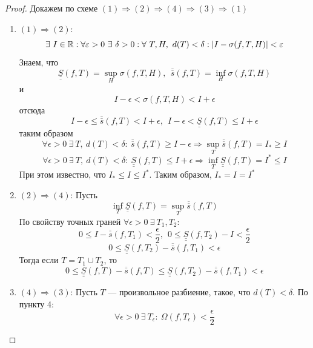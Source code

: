 \begin{proof} Докажем по схеме $(1)\Rightarrow(2) \Rightarrow(4) \Rightarrow (3) \Rightarrow (1)$
    \begin{enumerate}
        \item $(1) \Rightarrow (2)$:
            \[\exists\ I\in \R: \forall \epsilon > 0\ \exists\ \delta > 0: \forall\ T, H,\ d(T) < \delta:|I - \sigma(f, T, H)| < \epsilon\]
            Знаем, что 
            \[\underline{\underline{S}}(f, T) = \sup\limits_H \sigma(f, T, H),\ \ \overline{\overline{s}}(f, T) = \inf\limits_H \sigma(f, T, H)\]
            и
            \[I - \epsilon < \sigma(f, T, H) < I + \epsilon\]
            отсюда
            \[I - \epsilon \leq \overline{\overline{s}}(f, T) < I + \epsilon, \ \ I - \epsilon < \underline{\underline{S}}(f, T) \leq I + \epsilon\]
            таким образом %
            \[\forall \epsilon>0\ \exists\ T,\ d(T)<\delta:\ \overline{\overline{s}}(f,T)\geq I-\epsilon \Rightarrow \sup\limits_{T}\overline{\overline{s}}(f,T) = I_*\geq I\]
            \[\forall \epsilon>0\ \exists\ T,\ d(T)<\delta:\ \underline{\underline{S}}(f,T)\leq I+\epsilon \Rightarrow \inf\limits_{T}\underline{\underline{S}}(f,T)=I^*\leq I\]
            При этом известно, что $I_*\leq I\leq I^*$. Таким образом, $I_*=I=I^*$
        \item $(2)\Rightarrow(4)$: Пусть
            \[\inf \limits_{T} \underline{\underline{S}}(f, T) = \sup \limits_{T} \overline{\overline{s}}(f, T)\]
            По свойству точных граней $\forall \epsilon > 0 \ \exists\ T_1, T_2$:
            \[0 \leq I - \overline{\overline{s}}(f, T_1) < \frac{\epsilon}{2},\ \  0 \leq \underline{\underline{S}}(f, T_2)-I < \frac{\epsilon}{2}\]
            \[0 \leq \underline{\underline{S}}(f, T_2) - \overline{\overline{s}}(f, T_1) < \epsilon\]
            Тогда если $T=T_1\cup T_2$, то 
            \[0\leq \underline{\underline{S}}(f,T)-\overline{\overline{s}}(f,T)\leq \underline{\underline{S}}(f,T_2)-\overline{\overline{s}}(f,T_1)<\epsilon\]
        \item $(4) \Rightarrow (3)$: Пусть $T$ --- произвольное разбиение, такое, что $d(T)<\delta$. По пункту 4:
            \[\forall \epsilon>0\ \exists\ T_{\epsilon}:\ \Omega(f,T_{\epsilon})<\frac{\epsilon}{2}\]

\end{enumerate}
\end{proof}

